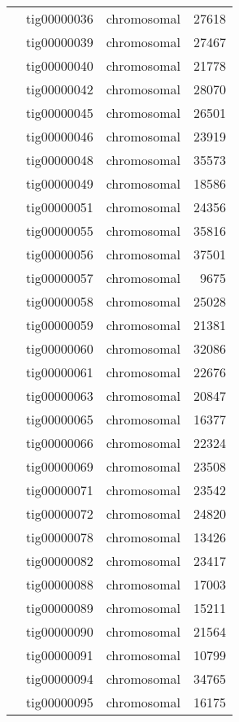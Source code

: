 {\begin{supertabular}{llcr}
         & tig00000036 & chromosomal & 27618 \\
         & tig00000039 & chromosomal & 27467 \\
         & tig00000040 & chromosomal & 21778 \\
         & tig00000042 & chromosomal & 28070 \\
         & tig00000045 & chromosomal & 26501 \\
         & tig00000046 & chromosomal & 23919 \\
         & tig00000048 & chromosomal & 35573 \\
         & tig00000049 & chromosomal & 18586 \\
         & tig00000051 & chromosomal & 24356 \\
         & tig00000055 & chromosomal & 35816 \\
         & tig00000056 & chromosomal & 37501 \\
         & tig00000057 & chromosomal & 9675 \\
         & tig00000058 & chromosomal & 25028 \\
         & tig00000059 & chromosomal & 21381 \\
         & tig00000060 & chromosomal & 32086 \\
         & tig00000061 & chromosomal & 22676 \\
         & tig00000063 & chromosomal & 20847 \\
         & tig00000065 & chromosomal & 16377 \\
         & tig00000066 & chromosomal & 22324 \\
         & tig00000069 & chromosomal & 23508 \\
         & tig00000071 & chromosomal & 23542 \\
         & tig00000072 & chromosomal & 24820 \\
         & tig00000078 & chromosomal & 13426 \\
         & tig00000082 & chromosomal & 23417 \\
         & tig00000088 & chromosomal & 17003 \\
         & tig00000089 & chromosomal & 15211 \\
         & tig00000090 & chromosomal & 21564 \\
         & tig00000091 & chromosomal & 10799 \\
         & tig00000094 & chromosomal & 34765 \\
         & tig00000095 & chromosomal & 16175 \\

\end{supertabular}}
